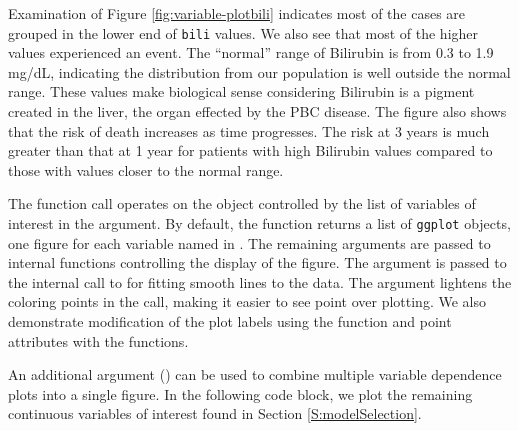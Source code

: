 \documentclass[article]{jss}
\begin{document}
Examination of Figure \ref{fig:variable-plotbili} indicates most of the
cases are grouped in the lower end of \texttt{bili} values. We also see
that most of the higher values experienced an event. The ``normal''
range of Bilirubin is from 0.3 to 1.9 mg/dL, indicating the distribution
from our population is well outside the normal range. These values make
biological sense considering Bilirubin is a pigment created in the
liver, the organ effected by the PBC disease. The figure also shows that
the risk of death increases as time progresses. The risk at 3 years is
much greater than that at 1 year for patients with high Bilirubin values
compared to those with values closer to the normal range.

The  function call operates on the
 object controlled by the list of variables of
interest in the  argument. By default, the
 function returns a list of \texttt{ggplot}
objects, one figure for each variable named in . The
remaining arguments are passed to internal  functions
controlling the display of the figure. The  argument is passed
to the internal call to  for fitting smooth lines to
the data. The  argument lightens the coloring points in the
 call, making it easier to see point over plotting. We
also demonstrate modification of the plot labels using the 
function and point attributes with the  functions.

An additional  argument () can
be used to combine multiple variable dependence plots into a single
figure. In the following code block, we plot the remaining continuous
variables of interest found in Section \ref{S:modelSelection}.
\end{document}
